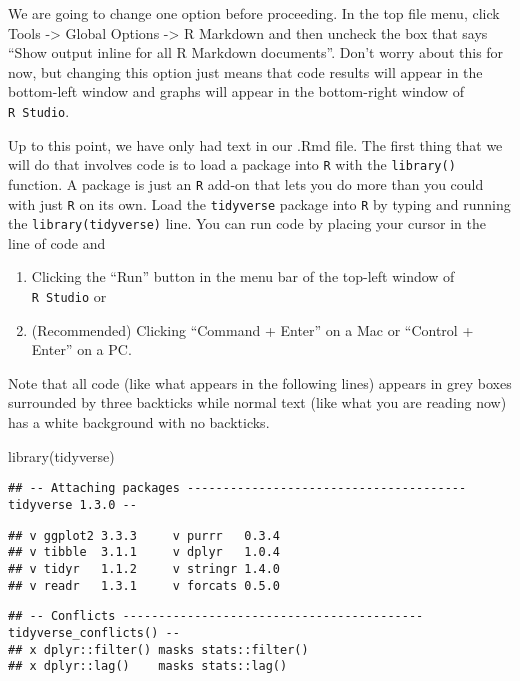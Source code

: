 \documentclass[
]{book}
\newenvironment{Shaded}{\begin{snugshade}}{\end{snugshade}}
\newcommand{\FunctionTok}[1]{\textcolor[rgb]{0.00,0.00,0.00}{#1}}
\newcommand{\NormalTok}[1]{#1}
\begin{document}
We are going to change one option before proceeding. In the top file menu, click Tools -\textgreater{} Global Options -\textgreater{} R Markdown and then uncheck the box that says ``Show output inline for all R Markdown documents''. Don't worry about this for now, but changing this option just means that code results will appear in the bottom-left window and graphs will appear in the bottom-right window of \texttt{R\ Studio}.

Up to this point, we have only had text in our .Rmd file. The first thing that we will do that involves code is to load a package into \texttt{R} with the \texttt{library()} function. A package is just an \texttt{R} add-on that lets you do more than you could with just \texttt{R} on its own. Load the \texttt{tidyverse} package into \texttt{R} by typing and running the \texttt{library(tidyverse)} line. You can run code by placing your cursor in the line of code and

\begin{enumerate}
\def\labelenumi{\arabic{enumi}.}
\item
  Clicking the ``Run'' button in the menu bar of the top-left window of \texttt{R\ Studio} or
\item
  (Recommended) Clicking ``Command + Enter'' on a Mac or ``Control + Enter'' on a PC.
\end{enumerate}

Note that all code (like what appears in the following lines) appears in grey boxes surrounded by three backticks while normal text (like what you are reading now) has a white background with no backticks.

\begin{Shaded}
\begin{Highlighting}[]
\FunctionTok{library}\NormalTok{(tidyverse)}
\end{Highlighting}
\end{Shaded}

\begin{verbatim}
## -- Attaching packages --------------------------------------- tidyverse 1.3.0 --
\end{verbatim}

\begin{verbatim}
## v ggplot2 3.3.3     v purrr   0.3.4
## v tibble  3.1.1     v dplyr   1.0.4
## v tidyr   1.1.2     v stringr 1.4.0
## v readr   1.3.1     v forcats 0.5.0
\end{verbatim}

\begin{verbatim}
## -- Conflicts ------------------------------------------ tidyverse_conflicts() --
## x dplyr::filter() masks stats::filter()
## x dplyr::lag()    masks stats::lag()
\end{verbatim}
\end{document}
